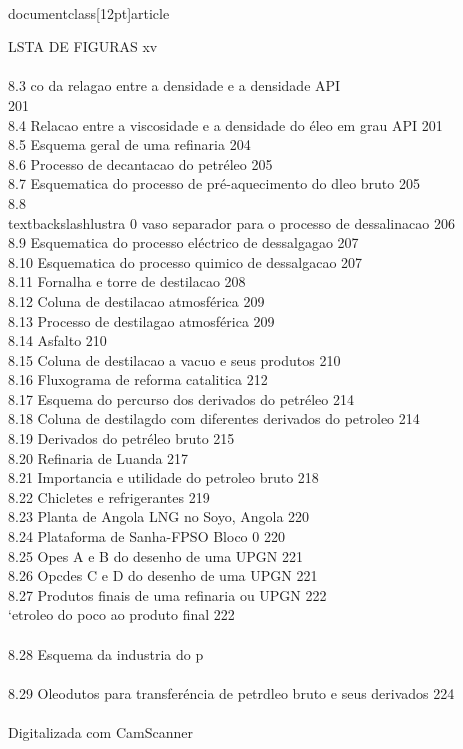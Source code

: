 \\documentclass[12pt]{article}
\begin{document}
LSTA DE FIGURAS xv\\
\\
8.3 co da relagao entre a densidade e a densidade API\\
201\\
8.4 Relacao entre a viscosidade e a densidade do éleo em grau API 201\\
8.5 Esquema geral de uma refinaria 204\\
8.6 Processo de decantacao do petréleo 205\\
8.7 Esquematica do processo de pré-aquecimento do dleo bruto 205\\
8.8 \\textbackslash{}lustra 0 vaso separador para o processo de dessalinacao 206\\
8.9 Esquematica do processo eléctrico de dessalgagao 207\\
8.10 Esquematica do processo quimico de dessalgacao 207\\
8.11 Fornalha e torre de destilacao 208\\
8.12 Coluna de destilacao atmosférica 209\\
8.13 Processo de destilagao atmosférica 209\\
8.14 Asfalto 210\\
8.15 Coluna de destilacao a vacuo e seus produtos 210\\
8.16 Fluxograma de reforma catalitica 212\\
8.17 Esquema do percurso dos derivados do petréleo 214\\
8.18 Coluna de destilagdo com diferentes derivados do petroleo 214\\
8.19 Derivados do petréleo bruto 215\\
8.20 Refinaria de Luanda 217\\
8.21 Importancia e utilidade do petroleo bruto 218\\
8.22 Chicletes e refrigerantes 219\\
8.23 Planta de Angola LNG no Soyo, Angola 220\\
8.24 Plataforma de Sanha-FPSO Bloco 0 220\\
8.25 Opes A e B do desenho de uma UPGN 221\\
8.26  Opcdes C e D do desenho de uma UPGN 221\\
8.27 Produtos finais de uma refinaria ou UPGN 222\\
‘etroleo do poco ao produto final 222\\
\\
8.28 Esquema da industria do p\\
\\
8.29 Oleodutos para transferéncia de petrdleo bruto e seus derivados 224\\
\\
Digitalizada com CamScanner\\
\end{document}
